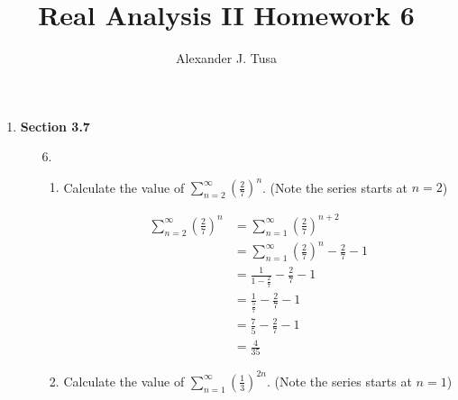 \documentclass[12pt,letterpaper]{article}
\author{Alexander J. Tusa}
\title{Real Analysis II Homework 6}
\theoremstyle{case}
\theoremstyle{definition}
\begin{document}
	\maketitle
	\begin{enumerate}
		\item \textbf{Section 3.7}
		\begin{enumerate}
			\item[6.]
			\begin{enumerate}
				 \item Calculate the value of $\displaystyle\sum_{n=2}^{\infty} \left(\frac{2}{7}\right)^n$. (Note the series starts at $n=2$)
				 
				 \begin{align*}
				 	\sum_{n=2}^{\infty} \left(\frac{2}{7}\right)^n &= \sum_{n=1}^{\infty} \left(\frac{2}{7}\right)^{n+2} \\
				 	&= \sum_{n=1}^{\infty} \left(\frac{2}{7}\right)^n-\frac{2}{7} - 1 \\
				 	&= \frac{1}{1-\frac{2}{7}} -\frac{2}{7} -1\\
				 	&= \frac{1}{\frac{5}{7}} - \frac{2}{7} -1\\
				 	&= \frac{7}{5} - \frac{2}{7} -1\\
				 	&= \frac{4}{35}
				 \end{align*}
				 
				 \item Calculate the value of $\displaystyle\sum_{n=1}^{\infty} \left(\frac{1}{3}\right)^{2n}$. (Note the series starts at $n=1$)
				 

\end{enumerate}
\end{enumerate}
\end{enumerate}
\end{document}
